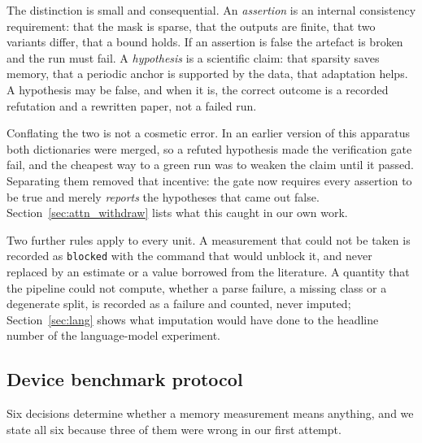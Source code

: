 The distinction is small and consequential. An \emph{assertion} is an internal
consistency requirement: that the mask is sparse, that the outputs are finite,
that two variants differ, that a bound holds. If an assertion is false the
artefact is broken and the run must fail. A \emph{hypothesis} is a scientific
claim: that sparsity saves memory, that a periodic anchor is supported by the
data, that adaptation helps. A hypothesis may be false, and when it is, the
correct outcome is a recorded refutation and a rewritten paper, not a failed run.

Conflating the two is not a cosmetic error. In an earlier version of this
apparatus both dictionaries were merged, so a refuted hypothesis made the
verification gate fail, and the cheapest way to a green run was to weaken the
claim until it passed. Separating them removed that incentive: the gate now
requires every assertion to be true and merely \emph{reports} the hypotheses that
came out false. Section~\ref{sec:attn_withdraw} lists what this caught in our own
work.

Two further rules apply to every unit. A measurement that could not be taken is
recorded as \texttt{blocked} with the command that would unblock it, and never
replaced by an estimate or a value borrowed from the literature. A quantity that
the pipeline could not compute, whether a parse failure, a missing class or a
degenerate split, is recorded as a failure and counted, never imputed;
Section~\ref{sec:lang} shows what imputation would have done to the headline
number of the language-model experiment.

\subsection{Device benchmark protocol}\label{sec:device_protocol}

Six decisions determine whether a memory measurement means anything, and we state
all six because three of them were wrong in our first attempt.

